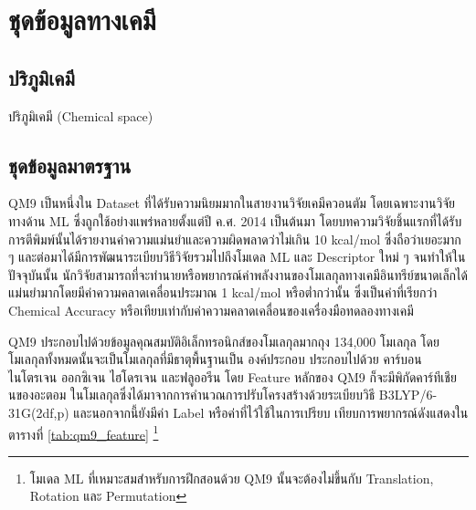

\chapter{ชุดข้อมูลทางเคมี}
\label{ch:dataset}

\section{ปริภูมิเคมี}

ปริภูมิเคมี (Chemical space) 

\section{ชุดข้อมูลมาตรฐาน}

QM9 เป็นหนึ่งใน Dataset ที่ได้รับความนิยมมากในสายงานวิจัยเคมีควอนตัม โดยเฉพาะงานวิจัยทางด้าน ML ซึ่งถูกใช้อย่างแพร่หลายตั้งแต่ปี ค.ศ. 
2014 เป็นต้นมา\cite{ramakrishnan2014} โดยบทความวิจัยชิ้นแรกที่ได้รับการตีพิมพ์นั้นได้รายงานค่าความแม่นยำและความผิดพลาดว่าไม่เกิน 
10 kcal/mol ซึ่งถือว่าเยอะมาก ๆ และต่อมาได้มีการพัฒนาระเบียบวิธีวิจัยรวมไปถึงโมเดล ML และ Descriptor ใหม่ ๆ จนทำให้ในปัจจุบันนั้น%
นักวิจัยสามารถที่จะทำนายหรือพยากรณ์ค่าพลังงานของโมเลกุลทางเคมีอินทรีย์ขนาดเล็กได้แม่นยำมากโดยมีค่าความคลาดเคลื่อนประมาณ 1 kcal/mol 
หรือต่ำกว่านั้น ซึ่งเป็นค่าที่เรียกว่า Chemical Accuracy หรือเทียบเท่ากับค่าความคลาดเคลื่อนของเครื่องมือทดลองทางเคมี

QM9 ประกอบไปด้วยข้อมูลคุณสมบัติอิเล็กทรอนิกส์ของโมเลกุลมากถุง 134,000 โมเลกุล โดยโมเลกุลทั้งหมดนั้นจะเป็นโมเลกุลที่มีธาตุพื้นฐานเป็น%
องค์ประกอบ ประกอบไปด้วย คาร์บอน ไนโตรเจน ออกซิเจน ไฮโดรเจน และฟลูออรีน โดย Feature หลักของ QM9 ก็จะมีพิกัดคาร์ทีเชียนของอะตอม%
ในโมเลกุลซึ่งได้มาจากการคำนวณการปรับโครงสร้างด้วยระเบียบวิธี B3LYP/6-31G(2df,p) และนอกจากนี้ยังมีค่า Label หรือค่าที่ไว้ใช้ในการเปรียบ%
เทียบการพยากรณ์ดังแสดงในตารางที่ \ref{tab:qm9_feature}
\footnote{โมเดล ML ที่เหมาะสมสำหรับการฝึกสอนด้วย QM9 นั้นจะต้องไม่ขึ้นกับ Translation, Rotation และ Permutation}

